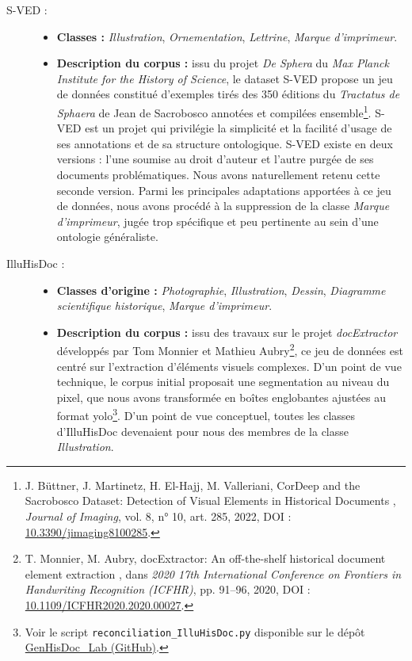 \begin{description}
	\item[S-VED :] \hfill
	\begin{itemize}
		\item \textbf{Classes :} \textit{Illustration}, \textit{Ornementation}, \textit{Lettrine}, \textit{Marque d'imprimeur}.
		\item \textbf{Description du corpus :} issu du projet \textit{De Sphera} du \textit{Max Planck Institute for the History of Science}, le dataset S-VED propose un jeu de données constitué d'exemples tirés des 350 éditions du \textit{Tractatus de Sphaera} de Jean de Sacrobosco annotées et compilées ensemble\footnote{J. Büttner, J. Martinetz, H. El-Hajj, M. Valleriani, \og CorDeep and the Sacrobosco Dataset: Detection of Visual Elements in Historical Documents \fg, \textit{Journal of Imaging}, vol. 8, n° 10, art. 285, 2022, DOI : \href{https://doi.org/10.3390/jimaging8100285}{10.3390/jimaging8100285}.}. S-VED est un projet qui privilégie la simplicité et la facilité d'usage de ses annotations et de sa structure ontologique. S-VED existe en deux versions : l'une soumise au droit d'auteur et l'autre purgée de ses documents problématiques. Nous avons naturellement retenu cette seconde version. Parmi les principales adaptations apportées à ce jeu de données, nous avons procédé à la suppression de la classe \textit{Marque d'imprimeur}, jugée trop spécifique et peu pertinente au sein d'une ontologie généraliste.
	\end{itemize}


\item[IlluHisDoc :] \hfill
\begin{itemize}
	\item \textbf{Classes d'origine :} \textit{Photographie}, \textit{Illustration}, \textit{Dessin}, \textit{Diagramme scientifique historique}, \textit{Marque d'imprimeur}.
	\item \textbf{Description du corpus :} issu des travaux sur le projet \textit{docExtractor} développés par Tom Monnier et Mathieu Aubry\footnote{T. Monnier, M. Aubry, \og docExtractor: An off-the-shelf historical document element extraction \fg, dans \textit{2020 17th International Conference on Frontiers in Handwriting Recognition (ICFHR)}, pp. 91--96, 2020, DOI : \href{https://doi.org/10.1109/ICFHR2020.2020.00027}{10.1109/ICFHR2020.2020.00027}.}, ce jeu de données est centré sur l'extraction d'éléments visuels complexes. D'un point de vue technique, le corpus initial proposait une segmentation au niveau du pixel, que nous avons transformée en boîtes englobantes ajustées au format \gls{yolo}\footnote{Voir le script \texttt{reconciliation\_IlluHisDoc.py} disponible sur le dépôt \href{https://github.com/Anarchiviste/GenHisDoc_Lab/blob/main/01_code/reconciliation_illuhisdoc.py}{GenHisDoc\_Lab (GitHub)}.}. D'un point de vue conceptuel, toutes les classes d'IlluHisDoc devenaient pour nous des membres de la classe \textit{Illustration}.
\end{itemize}


\end{description}
